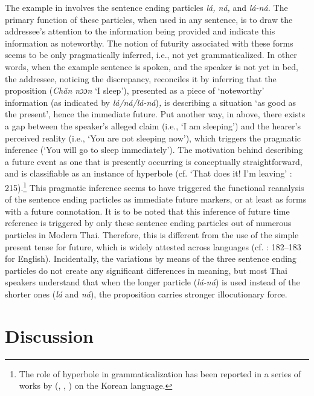 \documentclass[output=paper,colorlinks,citecolor=brown]{langscibook}
\begin{document}
The example in  involves the sentence ending particles \textit{lá, ná, }and \textit{lá-ná.} The primary function of these particles, when used in any sentence, is to draw the addressee's attention to the information being provided and indicate this information as noteworthy. The notion of futurity associated with these forms seems to be only pragmatically inferred, i.e., not yet grammaticalized. In other words, when the example sentence  is spoken, and the speaker is not yet in bed, the addressee, noticing the discrepancy, reconciles it by inferring that the proposition (\textit{C}\textit{hǎn nɔɔn} ‘I sleep’), presented as a piece of ‘noteworthy’ information (as indicated by \textit{lá/ná/lá-ná})\textit{,} is describing a situation ‘as good as the present’, hence the immediate future. Put another way, in  above, there exists a gap between the speaker's alleged claim (i.e., ‘I am sleeping’) and the hearer's perceived reality (i.e., ‘You are not sleeping now’), which triggers the pragmatic inference (‘You will go to sleep immediately’). The motivation behind describing a future event as one that is presently occurring is conceptually straightforward, and is classifiable as an instance of hyperbole (cf. ‘That does it! I’m leaving’ \cite{QuirkEtAl1985}: 215).\footnote{The role of hyperbole in grammaticalization has been reported in a series of works by \citeauthor{Rhee2003} (\citeyear{Rhee2003}, \citeyear{Rhee2009}, \citeyear{Rhee2022}) on the Korean language.} This pragmatic inference seems to have triggered the functional reanalysis of the sentence ending particles as immediate future markers, or at least as forms with a future connotation. It is to be noted that this inference of future time reference is triggered by only these sentence ending particles out of numerous particles in Modern Thai. Therefore, this is different from the use of the simple present tense for future, which is widely attested across languages (cf. \cite{QuirkEtAl1985}: 182--183 for English). Incidentally, the variations by means of the three sentence ending particles do not create any significant differences in meaning, but most Thai speakers understand that when the longer particle (\textit{lá-ná}) is used instead of the shorter ones (\textit{lá} and \textit{ná}), the proposition carries stronger illocutionary force. 

\largerpage[1]

\section{Discussion} \label{sec:khammee:3}
\end{document}

